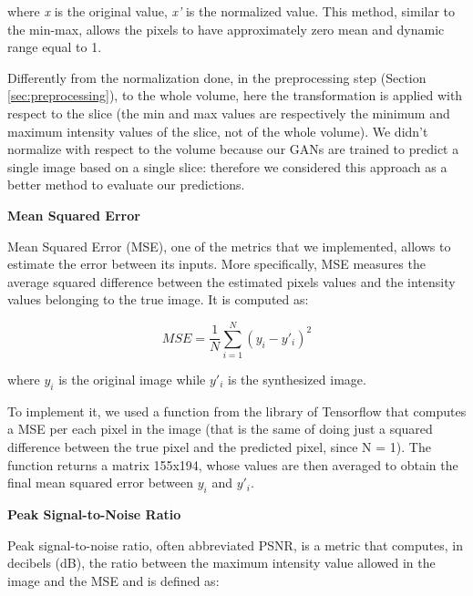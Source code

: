 where \textit{x} is the original value, \textit{x'} is the normalized value. This method, similar to the min-max, allows the pixels to have approximately zero mean and dynamic range equal to 1. 

Differently from the normalization done, in the preprocessing step (Section \ref{sec:preprocessing}), to the whole volume, here the transformation is applied with respect to the slice (the min and max values are respectively the minimum and maximum intensity values of the slice, not of the whole volume). We didn't normalize with respect to the volume because our \ac{GAN}s are trained to predict a single image based on a single slice: therefore we considered this approach as a better method to evaluate our predictions.


\vspace{6mm} 
\noindent\textbf{Mean Squared Error}

\vspace{2mm}
\noindent Mean Squared Error (MSE), one of the metrics that we implemented, allows to estimate the error between its inputs. More specifically, MSE measures the average squared difference between the estimated pixels values and the intensity values belonging to the true image. It is computed as:

\begin{equation} \label{eq:mse}
MSE =  \frac{1}{N} \sum_{i=1}^{N} (y_i - y'_i)^2
\end{equation}

where $y_i$ is the original image while $y'_i$ is the synthesized image. 

To implement it, we used a function from the library of Tensorflow that computes a MSE per each pixel in the image (that is the same of doing just a squared difference between the true pixel and the predicted pixel, since N = 1). The function returns a matrix 155x194, whose values are then averaged to obtain the final mean squared error between $y_i$ and $y'_i$.

\newpage
\noindent\textbf{Peak Signal-to-Noise Ratio}

\vspace{2mm}
\noindent Peak signal-to-noise ratio, often abbreviated PSNR, is a metric that computes, in decibels (dB), the ratio between the maximum intensity value allowed in the image \cite{psnr} and the MSE and is defined as:

